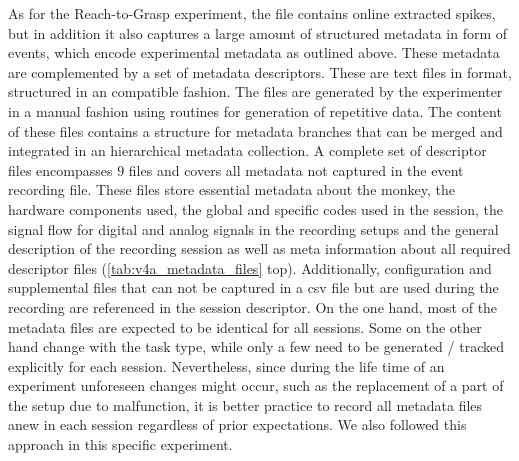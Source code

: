 As for the Reach-to-Grasp experiment, the  file contains online extracted spikes, but in addition it also captures a large amount of structured metadata in form of events, which encode experimental metadata as outlined above.
These metadata are complemented by a set of metadata descriptors. These are text files in  format, structured in an  compatible fashion. The files are generated by the experimenter in a manual fashion using  routines for generation of repetitive data. The content of these files contains a structure for metadata branches that can be merged and integrated in an hierarchical  metadata collection. A complete set of descriptor files encompasses $9$  files and covers all metadata not captured in the event recording file. These  files store essential metadata about the monkey, the hardware components used, the global and specific codes used in the session, the signal flow for digital and analog signals in the recording setups and the general description of the recording session as well as meta information about all required descriptor files (\cref{tab:v4a_metadata_files} top). Additionally, configuration and supplemental files that can not be captured in a csv file but are used during the recording are referenced in the session descriptor. On the one hand, most of the metadata files are expected to be identical for all sessions. Some on the other hand change with the task type, while only a few need to be generated / tracked explicitly for each session. Nevertheless, since during the life time of an experiment unforeseen changes might occur, such as the replacement of a part of the setup due to malfunction, it is better practice to record all metadata files anew in each session regardless of prior expectations. We also followed this approach in this specific experiment.

